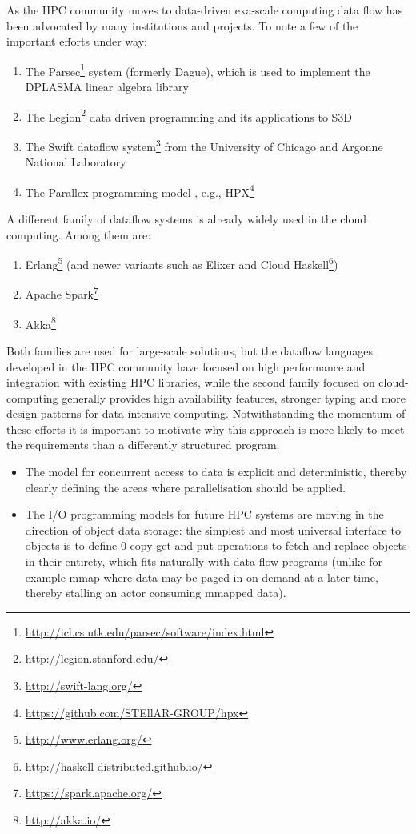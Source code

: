 \documentclass[11pt,a4paper]{article}
\begin{document}
As the HPC community moves to data-driven exa-scale computing data
flow has been advocated by many institutions and projects.  To note a
few of the important efforts under way:

\begin{enumerate}
\item The
  Parsec\footnote{\url{http://icl.cs.utk.edu/parsec/software/index.html} }
  system (formerly Dague), which is used to implement the DPLASMA
  linear algebra library
 \item The Legion\footnote{\url{http://legion.stanford.edu/}{} } data
   driven programming and its applications to S3D
 \item The Swift dataflow system\footnote{\url{http://swift-lang.org/}
   } from the University of Chicago and Argonne National Laboratory
 \item The Parallex programming model \citep{Kaiser5364511}, e.g.,
   HPX\footnote{\url{https://github.com/STEllAR-GROUP/hpx} }
\end{enumerate}

A different family of dataflow systems is already widely used in the
cloud computing.  Among them are:
\begin{enumerate}
\item Erlang\footnote{\url{http://www.erlang.org/} } (and newer
  variants such as Elixer and Cloud
  Haskell\footnote{\url{http://haskell-distributed.github.io/} })
  \item Apache Spark\footnote{\url{https://spark.apache.org/} }
  \item Akka\footnote{\url{http://akka.io/} }
\end{enumerate}

Both families are used for large-scale solutions, but the dataflow
languages developed in the HPC community have focused on high
performance and integration with existing HPC libraries, while the
second family focused on cloud-computing generally provides high
availability features, stronger typing and more design patterns for
data intensive computing.  Notwithstanding the momentum of these
efforts it is important to motivate why this approach is more likely
to meet the requirements than a differently structured program.

\begin{itemize}
\item The model for concurrent access to data is
explicit and deterministic, thereby clearly defining the areas where
parallelisation should be applied.  
\item The I/O programming models for future HPC systems are moving in
  the direction of object data storage: the simplest and most
  universal interface to objects is to define 0-copy get and put
  operations to fetch and replace objects in their entirety, which
  fits naturally with data flow programs (unlike for example mmap
  where data may be paged in on-demand at a later time, thereby
  stalling an actor consuming mmapped data).
\end{itemize}
\end{document}
